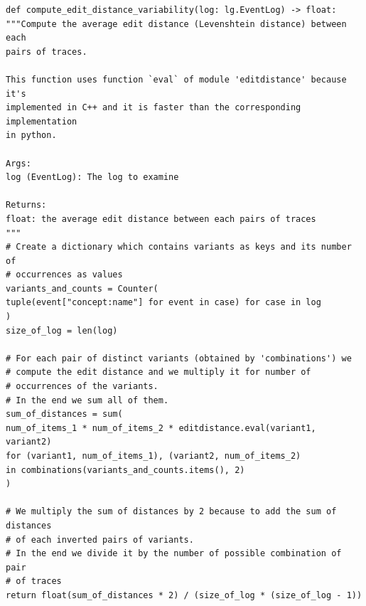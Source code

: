 \documentclass[12pt]{article}
\newenvironment{code}{\captionsetup{type=listing}}{}
\begin{document}
\begin{code}
	\label{code:code2}
	\begin{verbatim}
def compute_edit_distance_variability(log: lg.EventLog) -> float:
"""Compute the average edit distance (Levenshtein distance) between each
pairs of traces.

This function uses function `eval` of module 'editdistance' because it's
implemented in C++ and it is faster than the corresponding implementation
in python.

Args:
log (EventLog): The log to examine

Returns:
float: the average edit distance between each pairs of traces
"""
# Create a dictionary which contains variants as keys and its number of
# occurrences as values
variants_and_counts = Counter(
tuple(event["concept:name"] for event in case) for case in log
)
size_of_log = len(log)

# For each pair of distinct variants (obtained by 'combinations') we
# compute the edit distance and we multiply it for number of
# occurrences of the variants.
# In the end we sum all of them.
sum_of_distances = sum(
num_of_items_1 * num_of_items_2 * editdistance.eval(variant1, variant2)
for (variant1, num_of_items_1), (variant2, num_of_items_2)
in combinations(variants_and_counts.items(), 2)
)

# We multiply the sum of distances by 2 because to add the sum of distances
# of each inverted pairs of variants.
# In the end we divide it by the number of possible combination of pair
# of traces
return float(sum_of_distances * 2) / (size_of_log * (size_of_log - 1))
	\end{verbatim}
\end{code}
\end{document}
